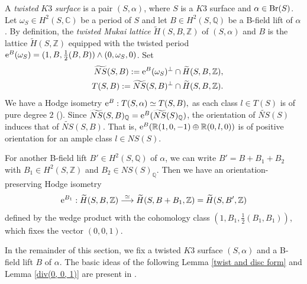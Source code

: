 \documentclass{article}
\theoremstyle{plain}
\theoremstyle{definition}
\theoremstyle{remark}
\newcommand{\Z}{{\mathbb Z}}
\newcommand{\C}{{\mathbb C}}
\newcommand{\Q}{{\mathbb Q}}
\newcommand{\R}{{\mathbb R}}
\begin{document}
A {\it twisted\/} $K3$ {\it surface\/} 
is a pair $(S, \alpha )$, 
where $S$ is a $K3$ surface 
and $\alpha \in {\rm Br\/}(S)$. 
Let 
$\omega _{S} \in H^{2}(S, {\C})$ 
be a period of $S$ 
and let $B \in H^{2}(S, {\Q})$ 
be a B-field lift of $\alpha $. 
By definition, the 
{\it twisted Mukai lattice\/} 
$\widetilde{H}(S, B, {\Z})$ of 
$(S, \alpha )$ and $B$ 
is the lattice $\widetilde{H}(S, {\Z})$ 
equipped with the twisted period 
${\rm e\/}^{B}(\omega _{S}) = 
(1, B, \frac{1}{2}(B, B)) \wedge (0, \omega _{S}, 0)$. 
Set  
\begin{eqnarray*}\label{twisted Neron-Severi and transcendental}
& & \widetilde{NS}(S, B) := 
                  {\rm e\/}^{B}(\omega _{S})^{\perp} \cap \widetilde{H}(S, B, {\Z}),  \\
& & T(S, B) := 
            \widetilde{NS}(S, B)^{\perp} \cap \widetilde{H}(S, B, {\Z}).
\end{eqnarray*} 
We have a Hodge isometry 
$
{\rm e\/}^{B} : T(S, \alpha ) \simeq T(S, B), 
$
as each class $l \in T(S)$ 
is of pure degree $2$ (\cite{H-S1}). 
Since 
$\widetilde{NS}(S, B)_{{\Q}} = {\rm e\/}^{B}(\widetilde{NS}(S)_{{\Q}})$, 
the orientation of 
$\widetilde{NS}(S)$ 
induces that of 
$\widetilde{NS}(S, B)$. 
That is, 
${\rm e\/}^{B}({\R}(1, 0, -1) \oplus {\R}(0, l, 0))$ 
is of positive orientation 
for an ample class  
$l \in NS(S)$. 

 




For another B-field lift 
$B' \in H^{2}(S, {\Q})$ of $\alpha $, 
we can write 
$B' = B + B_{1} + B_{2}$ 
with 
$B_{1} \in H^{2}(S, {\Z})$ 
and 
$B_{2} \in NS(S)_{{\Q}}$. 
Then 
we have an orientation-preserving Hodge isometry 
\begin{equation*}
{\rm e\/}^{B_{1}}  : 
\widetilde{H}(S, B, {\Z}) 
\stackrel{\simeq}{\longrightarrow} 
\widetilde{H}(S, B+B_{1}, {\Z})=\widetilde{H}(S, B', {\Z})  
\end{equation*}
defined by the wedge product with the cohomology class 
$(1, B_{1}, \frac{1}{2}(B_{1}, B_{1}))$,   
which 
fixes the vector $(0, 0, 1)$. 








In the remainder of this section, 
we fix a twisted $K3$ surface $(S, \alpha )$ 
and a B-field lift $B$ of $\alpha $.  
The basic ideas of the following Lemma \ref{twist and disc form} and Lemma \ref{div(0, 0, 1)} 
are present in \cite{Mu}. 
\end{document}
